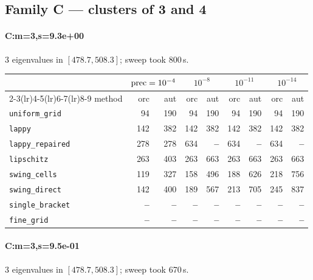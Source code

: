 \subsection{Family C --- clusters of 3 and 4}

\paragraph{C:m=3,s=9.3e+00} 3 eigenvalues in $[478.7, 508.3]$; sweep took 800\,s.

\begin{center}
\small
\begin{tabular}{lrrrrrrrr}
\toprule
& \multicolumn{2}{c}{$\mathrm{prec}=10^{-4}$} & \multicolumn{2}{c}{$10^{-8}$} & \multicolumn{2}{c}{$10^{-11}$} & \multicolumn{2}{c}{$10^{-14}$} \\
\cmidrule(lr){2-3}\cmidrule(lr){4-5}\cmidrule(lr){6-7}\cmidrule(lr){8-9}
method & orc & aut & orc & aut & orc & aut & orc & aut \\
\midrule
\texttt{uniform\_grid} & 94 & 190 & 94 & 190 & 94 & 190 & 94 & 190 \\
\texttt{lappy} & 142 & 382 & 142 & 382 & 142 & 382 & 142 & 382 \\
\texttt{lappy\_repaired} & 278 & 278 & 634 & \textbf{--} & 634 & \textbf{--} & 634 & \textbf{--} \\
\texttt{lipschitz} & 263 & 403 & 263 & 663 & 263 & 663 & 263 & 663 \\
\texttt{swing\_cells} & 119 & 327 & 158 & 496 & 188 & 626 & 218 & 756 \\
\texttt{swing\_direct} & 142 & 400 & 189 & 567 & 213 & 705 & 245 & 837 \\
\midrule
\texttt{single\_bracket} & \textbf{--} & \textbf{--} & \textbf{--} & \textbf{--} & \textbf{--} & \textbf{--} & \textbf{--} & \textbf{--} \\
\texttt{fine\_grid} & \textbf{--} & \textbf{--} & \textbf{--} & \textbf{--} & \textbf{--} & \textbf{--} & \textbf{--} & \textbf{--} \\
\bottomrule
\end{tabular}
\end{center}

\paragraph{C:m=3,s=9.5e-01} 3 eigenvalues in $[478.7, 508.3]$; sweep took 670\,s.

